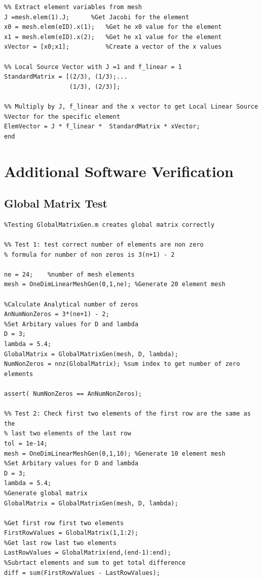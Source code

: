 \documentclass[11pt]{article}
\begin{document}
\begin{appendices}
\begin{lstlisting}
%% Extract element variables from mesh
J =mesh.elem(1).J;      %Get Jacobi for the element
x0 = mesh.elem(eID).x(1);   %Get he x0 value for the element
x1 = mesh.elem(eID).x(2);   %Get he x1 value for the element
xVector = [x0;x1];          %Create a vector of the x values

%% Local Source Vector with J =1 and f_linear = 1
StandardMatrix = [(2/3), (1/3);...
                  (1/3), (2/3)];
              
%% Multiply by J, f_linear and the x vector to get Local Linear Source 
%Vector for the specific element
ElemVector = J * f_linear *  StandardMatrix * xVector;
end
\end{lstlisting}


\clearpage
\section{Additional Software Verification}
\subsection{Global Matrix Test}
\begin{lstlisting}
%Testing GlobalMatrixGen.m creates global matrix correctly

%% Test 1: test correct number of elements are non zero
% formula for number of non zeros is 3(n+1) - 2

ne = 24;    %number of mesh elements
mesh = OneDimLinearMeshGen(0,1,ne); %Generate 20 element mesh

%Calculate Analytical number of zeros
AnNumNonZeros = 3*(ne+1) - 2;
%Set Arbitary values for D and lambda
D = 3;
lambda = 5.4;
GlobalMatrix = GlobalMatrixGen(mesh, D, lambda);
NumNonZeros = nnz(GlobalMatrix); %sum index to get number of zero elements

assert( NumNonZeros == AnNumNonZeros);

%% Test 2: Check first two elements of the first row are the same as the 
% last two elements of the last row
tol = 1e-14;
mesh = OneDimLinearMeshGen(0,1,10); %Generate 10 element mesh
%Set Arbitary values for D and lambda
D = 3;
lambda = 5.4;
%Generate global matrix
GlobalMatrix = GlobalMatrixGen(mesh, D, lambda);

%Get first row first two elements
FirstRowValues = GlobalMatrix(1,1:2);
%Get last row last two elements
LastRowValues = GlobalMatrix(end,(end-1):end);
%Subrtact elements and sum to get total difference
diff = sum(FirstRowValues - LastRowValues);


\end{lstlisting}
\end{appendices}
\end{document}
